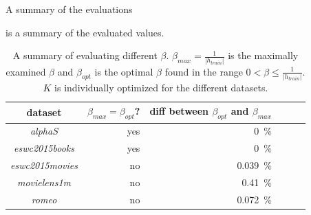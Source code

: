 \FloatBarrier

A summary of the evaluations 

 is a summary of the evaluated values.

\begin{table}[h]
    \centering
    \begin{tabular}{| c | r | r | r | r | l |}
        \hline
        \textbf{dataset}        & \textbf{$\beta_{max} = \beta_{opt}$?}     & \textbf{diff between $\beta_{opt}$ and $\beta_{max}$ }    \\ \hline

        \textit{alphaS}         &   yes     & 0~\%      \\ \hline
        \textit{eswc2015books}  &   yes     & 0~\%      \\ \hline
        \textit{eswc2015movies} &   no      & 0.039~\%  \\ \hline
        \textit{movielens1m}    &   no      & 0.41~\%   \\ \hline
        \textit{romeo}          &   no      & 0.072~\%  \\ \hline


    \end{tabular}
    \caption{A summary of evaluating different $\beta$. $\beta_{max} = \frac{1}{|h_{train}|}$ is the maximally examined $\beta$ and $\beta_{opt}$ is the optimal $\beta$ found in the range $0 < \beta \leq \frac{1}{|h_{train}|}$. $K$ is individually optimized for the different datasets.}
    \label{tab:katzeig_beta}
\end{table}

